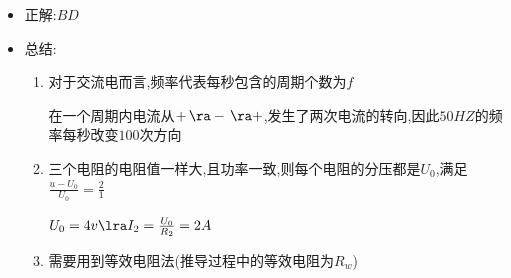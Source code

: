 \documentclass{article}
\begin{document}
\begin{itemize}
    \item 正解:\quad $BD$
    \item 总结:
          \begin{enumerate}[label = (\arabic*)]
              \item 对于交流电而言,频率代表每秒包含的周期个数为$f$

                    在一个周期内电流从$+ \, \ra - \, \ra +$,发生了两次电流的转向,因此$50HZ$的频率每秒改变$100$次方向
              \item 三个电阻的电阻值一样大,且功率一致,则每个电阻的分压都是$U_{0}$,满足$\frac{u-U_{0}}{U_{0}} = \frac{2}{1}$

                    $U_{0} = 4v \lra I_{2} = \frac{U_{0}}{R_{2}} = 2A$
              \item 需要用到等效电阻法(推导过程中的等效电阻为$R_{w}$)


\end{enumerate}
\end{itemize}
\end{document}

